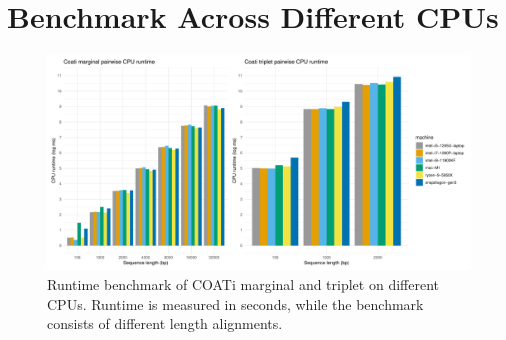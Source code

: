 \section*{Benchmark Across Different CPUs}
\begin{figure}[!ht]
    \centering
    \includegraphics[width = \textwidth]{chapter3/figures/results/benchmarks.pdf}
    \caption[Runtime Comparison of Triplet and Marginal COATi Models]{Runtime benchmark of COATi marginal and triplet on different CPUs. Runtime is measured in seconds, while the benchmark consists of different length alignments.}
    \label{fig:cpu-runtime}
\end{figure}

